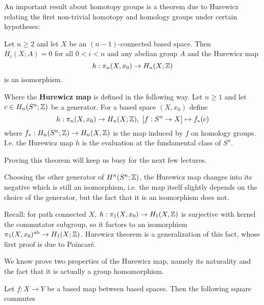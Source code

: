 An important result about homotopy groups is a theorem due to Hurewicz relating the first non-trivial homotopy and homology groups under certain hypotheses:

\begin{theorem}[Hurewicz]
Let $n\geq2$ and let $X$ be an $(n-1)$-connected based space. Then $H_i(X;A)=0$ for all $0<i<n$ and any abelian group $A$ and the Hurewicz map
\[h:\pi_n(X,x_0)\to H_n(X;{\mathbb Z})\]
is an isomorphism.
\end{theorem}

Where the \textbf{Hurewicz map} is defined in the following way. Let $n\geq1$ and let $c\in H_n(S^n;{\mathbb Z})$ be a generator. For a based space $(X,x_0)$ define
\[h:\pi_n(X,x_0)\to H_n(X;\Z),\ [f:S^n\to X]\mapsto f_*(c)\]
where $f_*:H_n(S^n;{\mathbb Z})\to H_n(X,{\mathbb Z})$ is the map induced by $f$ on homology groups. I.e. the Hurewicz map $h$ is the evaluation at the fundamental class of $S^n$.

Proving this theorem will keep us busy for the next few lectures.

\begin{remark}
Choosing the other generator of $H^n(S^n;{\mathbb Z})$, the Hurewicz map changes into its negative which is still an isomorphism, i.e. the map itself slightly depends on the choice of the generator, but the fact that it is an isomorphism does not.
\end{remark}

\begin{remark}
Recall: for path connected $X$, $h:\pi_1(X,x_0)\to H_1(X,{\mathbb Z})$ is surjective with kernel the commutator subgroup, so it factors to an isomorphism $\pi_1(X,x_0)^{\text{ab}}\to H_1(X;{\mathbb Z})$. Hurewicz theorem is a generalization of this fact, whose first proof is due to Poincaré.
\end{remark}

We know prove two properties of the Hurewicz map, namely its naturality and the fact that it is actually a group homomorphism.

 Let $f:X\to Y$ be a based map between based spaces. Then the following square commutes
\begin{center}
\end{center}

